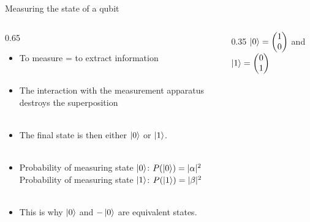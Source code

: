 \documentclass[aspectratio=169,12pt]{beamer}
\begin{document}
\begin{frame}{Measuring the state of a qubit}
  \begin{columns}[T]
    \begin{column}{0.65\textwidth}
      \begin{itemize}[<+->]
      \item To measure = to extract information\\~\\
      \item The interaction with the measurement apparatus destroys the superposition\\~\\
      \item The final state is then either $\ket 0$ or $\ket 1$.\\~\\
      \item Probability of measuring state $\ket 0$: $P(\ket 0)=|\alpha|^2$\\
      Probability of measuring state $\ket 1$: $P(\ket 1)=|\beta|^2$\\~\\
      \item This is why $\ket 0$ and $-\ket 0$ are equivalent states.
\end{itemize}
    \end{column}
    \begin{column}{0.35\textwidth}
      \vspace{2em}
      \centering
      $\ket 0 = \begin{pmatrix}1 \\ 0\end{pmatrix}$ and $\ket 1 = \begin{pmatrix}0 \\ 1\end{pmatrix}$\\~\\~\\
    \end{column}
  \end{columns}
\end{frame}
\end{document}
